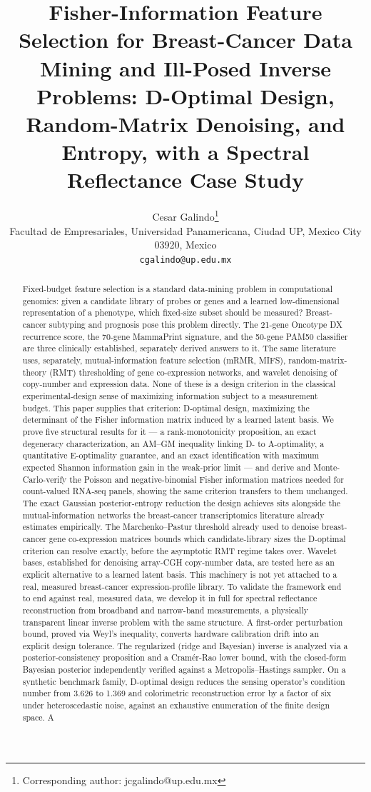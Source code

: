 \documentclass[11pt]{article}
\title{Fisher-Information Feature Selection for Breast-Cancer Data Mining and Ill-Posed Inverse Problems: D-Optimal Design, Random-Matrix Denoising, and Entropy, with a Spectral Reflectance Case Study}
\author{Cesar Galindo\thanks{Corresponding author: jcgalindo@up.edu.mx}\\
\small Facultad de Empresariales, Universidad Panamericana, Ciudad UP, Mexico City 03920, Mexico\\
\small \texttt{cgalindo@up.edu.mx}}
\date{}
\begin{document}
\maketitle

\begin{abstract}
\noindent Fixed-budget feature selection is a standard data-mining problem in computational genomics: given a candidate library of probes or genes and a learned low-dimensional representation of a phenotype, which fixed-size subset should be measured? Breast-cancer subtyping and prognosis pose this problem directly. The 21-gene Oncotype DX recurrence score, the 70-gene MammaPrint signature, and the 50-gene PAM50 classifier are three clinically established, separately derived answers to it. The same literature uses, separately, mutual-information feature selection (mRMR, MIFS), random-matrix-theory (RMT) thresholding of gene co-expression networks, and wavelet denoising of copy-number and expression data. None of these is a design criterion in the classical experimental-design sense of maximizing information subject to a measurement budget. This paper supplies that criterion: D-optimal design, maximizing the determinant of the Fisher information matrix induced by a learned latent basis. We prove five structural results for it --- a rank-monotonicity proposition, an exact degeneracy characterization, an AM--GM inequality linking D- to A-optimality, a quantitative E-optimality guarantee, and an exact identification with maximum expected Shannon information gain in the weak-prior limit --- and derive and Monte-Carlo-verify the Poisson and negative-binomial Fisher information matrices needed for count-valued RNA-seq panels, showing the same criterion transfers to them unchanged. The exact Gaussian posterior-entropy reduction the design achieves sits alongside the mutual-information networks the breast-cancer transcriptomics literature already estimates empirically. The Marchenko--Pastur threshold already used to denoise breast-cancer gene co-expression matrices bounds which candidate-library sizes the D-optimal criterion can resolve exactly, before the asymptotic RMT regime takes over. Wavelet bases, established for denoising array-CGH copy-number data, are tested here as an explicit alternative to a learned latent basis. This machinery is not yet attached to a real, measured breast-cancer expression-profile library. To validate the framework end to end against real, measured data, we develop it in full for spectral reflectance reconstruction from broadband and narrow-band measurements, a physically transparent linear inverse problem with the same structure. A first-order perturbation bound, proved via Weyl's inequality, converts hardware calibration drift into an explicit design tolerance. The regularized (ridge and Bayesian) inverse is analyzed via a posterior-consistency proposition and a Cram\'{e}r-Rao lower bound, with the closed-form Bayesian posterior independently verified against a Metropolis--Hastings sampler. On a synthetic benchmark family, D-optimal design reduces the sensing operator's condition number from 3.626 to 1.369 and colorimetric reconstruction error by a factor of six under heteroscedastic noise, against an exhaustive enumeration of the finite design space. A 
\end{abstract}
\end{document}
